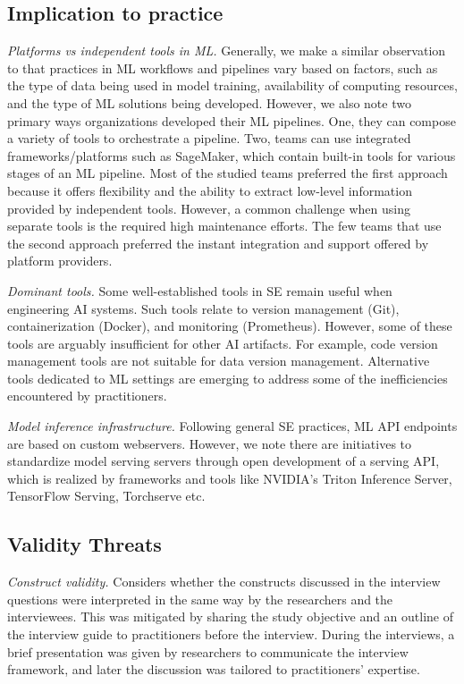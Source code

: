 \documentclass{IEEEcsmag}
\begin{document}
\subsection{Implication to practice}
\textit{Platforms vs independent tools in ML.} Generally, we make a similar observation to \cite{Doris2021MLPipelines} that practices in ML workflows and pipelines vary based on factors, such as the type of data being used in model training, availability of computing resources, and the type of ML solutions being developed. However, we also note two primary ways organizations developed their ML pipelines. One, they can compose a variety of tools to orchestrate a pipeline. Two, teams can use integrated frameworks/platforms such as SageMaker, which contain built-in tools for various stages of an ML pipeline. Most of the studied teams preferred the first approach because it offers flexibility and the ability to extract low-level information provided by independent tools. However, a common challenge when using separate tools is the required high maintenance efforts. The few teams that use the second approach preferred the instant integration and support offered by platform providers.

\textit{Dominant tools.} Some well-established tools in SE remain useful when engineering AI systems. Such tools relate to version management (Git), containerization (Docker), and monitoring (Prometheus). However, some of these tools are arguably insufficient for other AI artifacts. For example, code version management tools are not suitable for data version management. Alternative tools dedicated to ML settings are emerging to address some of the inefficiencies encountered by practitioners. 





\textit{Model inference infrastructure.} Following general SE practices, ML API endpoints are based on custom webservers. However, we note there are initiatives to standardize model serving servers through open development of a serving API, which is realized by frameworks and tools like NVIDIA's Triton Inference Server, TensorFlow Serving, Torchserve etc.

\subsection{Validity Threats}

\textit{Construct validity.} Considers whether the constructs discussed in the interview questions were interpreted in the same way by the researchers and the interviewees. This was mitigated by sharing the study objective and an outline of the interview guide to practitioners before the interview. During the interviews, a brief presentation was given by researchers to communicate the interview framework, and later the discussion was tailored to practitioners' expertise.
\end{document}
